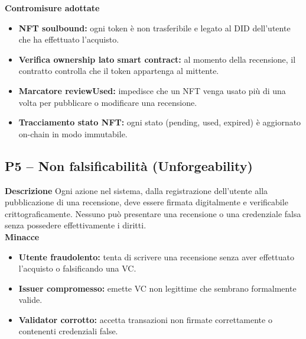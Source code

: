             \noindent \textbf{Contromisure adottate}
                \begin{itemize}
                    \item \textbf{NFT soulbound:} ogni token è non trasferibile e legato al DID dell'utente che ha effettuato l'acquisto.

                    \item \textbf{Verifica ownership lato smart contract:} al momento della recensione, il contratto controlla che il token appartenga al mittente.

                    \item \textbf{Marcatore reviewUsed:} impedisce che un NFT venga usato più di una volta per pubblicare o modificare una recensione.

                    \item \textbf{Tracciamento stato NFT:} ogni stato (pending, used, expired) è aggiornato on-chain in modo immutabile.
                \end{itemize}

        \subsection{P5 – Non falsificabilità (Unforgeability)}
            \noindent \textbf{Descrizione}
                Ogni azione nel sistema, dalla registrazione dell'utente alla pubblicazione di una recensione, deve essere firmata digitalmente e verificabile crittograficamente. Nessuno può presentare una recensione o una credenziale falsa senza possedere effettivamente i diritti. \\

            \noindent \textbf{Minacce}
                \begin{itemize}
                    \item \textbf{Utente fraudolento:} tenta di scrivere una recensione senza aver effettuato l'acquisto o falsificando una VC.

                    \item \textbf{Issuer compromesso:} emette VC non legittime che sembrano formalmente valide.

                    \item \textbf{Validator corrotto:} accetta transazioni non firmate correttamente o contenenti credenziali false.
                \end{itemize}

